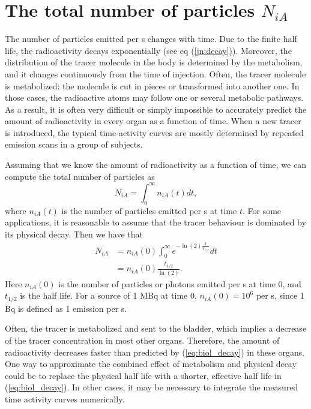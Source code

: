 \section{The total number of particles $N_{iA}$}
The number of particles emitted per s changes with time. Due to the finite
half life, the radioactivity decays exponentially (see eq
(\ref{jn:decay})). Moreover, the distribution of the tracer molecule in the
body is determined by the metabolism, and it changes continuously from the
time of injection. Often, the tracer molecule is metabolized: the molecule is
cut in pieces or transformed into another one. In those cases, the radioactive
atoms may follow one or several metabolic pathways. As a result, it is often
very difficult or simply impossible to accurately predict the amount of
radioactivity in every organ as a function of time. When a new tracer is
introduced, the typical time-activity curves are mostly determined by repeated
emission scans in a group of subjects.

Assuming that we know the amount of radioactivity as a function of time, we
can compute the total number of particles as
\begin{equation}
  N_{iA} =  \int_0^{\infty} n_{iA}(t) dt,
\end{equation}
where $n_{iA}(t)$ is the number of particles emitted per s at time $t$.
For some applications, it is reasonable to assume that the tracer behaviour is
dominated by its physical decay. Then we have that
\begin{align}
  N_{iA} &= n_{iA}(0) \int_0^{\infty} e^{- \ln(2) \frac{t}{t_{1/2}}} dt \nonumber\\
         &= n_{iA}(0) \frac{t_{1/2}}{\ln(2)}. \label{eq:biol_decay}
\end{align}
Here $n_{iA}(0)$ is the number of particles or photons emitted per s at time
0, and $t_{1/2}$ is the half life.
For a source of 1 MBq at time 0, $n_{iA}(0) = 10^6$ per s, since 1 Bq is
defined as 1 emission per s.

Often, the tracer is metabolized and sent to the bladder, which implies a
decrease of the tracer concentration in most other organs. Therefore,
the amount of radioactivity decreases faster than predicted by
(\ref{eq:biol_decay}) in these organs. One way to approximate the combined
effect of metabolism and physical decay could be to replace the physical
half life with a shorter, effective half life in (\ref{eq:biol_decay}).
In other cases, it may
be necessary to integrate the measured time activity curves numerically.

